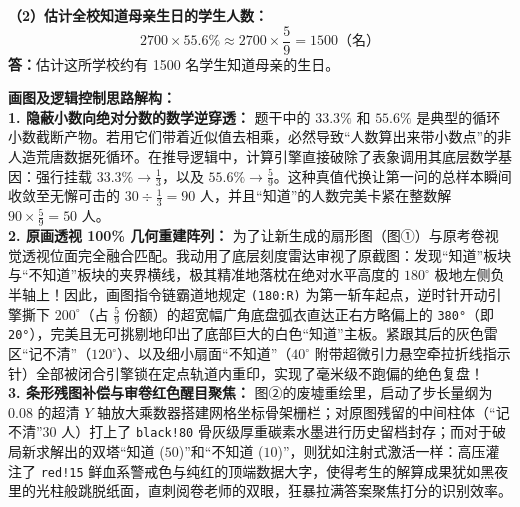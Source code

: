 \documentclass[12pt, a4paper]{ctexrep}
\begin{document}
\begin{center}
\end{center}

\vspace{0.4cm}
\textbf{（2）估计全校知道母亲生日的学生人数：}
\[
2700 \times 55.6\% \approx 2700 \times \frac{5}{9} = 1500 \text{（名）}
\]
\textbf{答：}估计这所学校约有 1500 名学生知道母亲的生日。

\vspace{0.4cm}
{\small\color{blue!70!black}
\textbf{画图及逻辑控制思路解构：}\\
\textbf{1. 隐蔽小数向绝对分数的数学逆穿透：} 题干中的 $33.3\%$ 和 $55.6\%$ 是典型的循环小数截断产物。若用它们带着近似值去相乘，必然导致“人数算出来带小数点”的非人造荒唐数据死循环。在推导逻辑中，计算引擎直接破除了表象调用其底层数学基因：强行挂载 $33.3\% \rightarrow \frac{1}{3}$，以及 $55.6\% \rightarrow \frac{5}{9}$。这种真值代换让第一问的总样本瞬间收敛至无懈可击的 $30 \div \frac{1}{3} = 90$ 人，并且“知道”的人数完美卡紧在整数解 $90 \times \frac{5}{9} = 50$ 人。\\
\textbf{2. 原画透视 100\% 几何重建阵列：} 为了让新生成的扇形图（图①）与原考卷视觉透视位面完全融合匹配。我动用了底层刻度雷达审视了原截图：发现“知道”板块与“不知道”板块的夹界横线，极其精准地落枕在绝对水平高度的 $180^\circ$ 极地左侧负半轴上！因此，画图指令链霸道地规定 \texttt{(180:R)} 为第一斩车起点，逆时针开动引擎撕下 $200^\circ$（占 $\frac{5}{9}$ 份额）的超宽幅广角底盘弧衣直达正右方略偏上的 \texttt{380°}（即 \texttt{20°}），完美且无可挑剔地印出了底部巨大的白色“知道”主板。紧跟其后的灰色雷区“记不清”（$120^\circ$）、以及细小扇面“不知道”（$40^\circ$ 附带超微引力悬空牵拉折线指示针）全部被闭合引擎锁在定点轨道内重印，实现了毫米级不跑偏的绝色复盘！\\
\textbf{3. 条形残图补偿与审卷红色醒目聚焦：} 图②的废墟重绘里，启动了步长量纲为 $0.08$ 的超清 $Y$ 轴放大乘数器搭建网格坐标骨架栅栏；对原图残留的中间柱体（“记不清”$30$ 人）打上了 \texttt{black!80} 骨灰级厚重碳素水墨进行历史留档封存；而对于破局新求解出的双塔“知道 ($50$)”和“不知道 ($10$)”，则犹如注射式激活一样：高压灌注了 \texttt{red!15} 鲜血系警戒色与纯红的顶端数据大字，使得考生的解算成果犹如黑夜里的光柱般跳脱纸面，直刺阅卷老师的双眼，狂暴拉满答案聚焦打分的识别效率。
}
\end{document}
